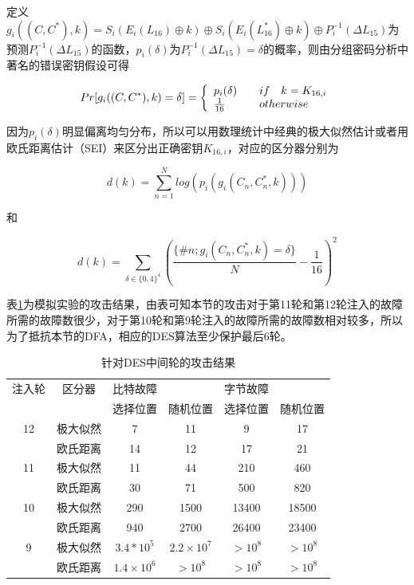 \documentclass[a4paper,12pt]{article}
\begin{document}
\begin{CJK}{UTF8}{gkai}
定义$g_i((C,C^*),k)=S_i(E_i(L_{16}) \oplus k) \oplus S_i(E_i(L_{16}^*) \oplus k) \oplus P_i^{-1}(\Delta L_{15})$为预测$P_i^{-1}(\Delta L_{15})$的函数，$p_i(\delta)$为$P_i^{-1}(\Delta L_{15}) = \delta$的概率，则由分组密码分析中著名的错误密钥假设可得

\[
  Pr[g_i((C, C^*), k) = \delta] = \left\{ 
  \begin{array}{l l}
    p_i(\delta) & \quad if \quad k = K_{16,i} \\
    \frac{1}{16} & \quad otherwise \\
  \end{array} \right.
\]

因为$p_i(\delta)$明显偏离均匀分布，所以可以用数理统计中经典的极大似然估计或者用欧氏距离估计（SEI）来区分出正确密钥$K_{16,i}$，对应的区分器分别为

\[
d(k)=\sum_{n=1}^{N}log(p_i(g_i(C_n,C_n^*, k)))
\]

和

\[
d(k) = \sum_{\delta \in \{0,4\}^4}( \frac{\{\#n;g_i(C_n,C_n^*,k) = \delta\}}{N} - \frac{1}{16})^2
\]

表\ref{tab:3_1}为模拟实验的攻击结果，由表可知本节的攻击对于第11轮和第12轮注入的故障所需的故障数很少，对于第10轮和第9轮注入的故障所需的故障数相对较多，所以为了抵抗本节的DFA，相应的DES算法至少保护最后6轮。

\begin{table}
\centering
\begin{tabular}{*{6}{c}}
注入轮 & 区分器 & 比特故障 &  & 字节故障  &   \\
\cline{3-3} \cline{5-5}
 & & 选择位置 & 随机位置 & 选择位置  & 随机位置  \\
\hline
12 & 极大似然 & 7 & 11 & 9 & 17 \\
   & 欧氏距离 & 14 & 12 & 17 & 21 \\
11 & 极大似然 & 11 & 44 & 210 & 460 \\
   & 欧氏距离 & 30 & 71 & 500 & 820 \\
10 & 极大似然 & 290 & 1500 & 13400 & 18500 \\
   & 欧氏距离 & 940 & 2700 & 26400 & 23400 \\
9  & 极大似然 & $3.4*10^5$ & $2.2 \times 10^7$ & $>10^8$ & $>10^8$ \\
   & 欧氏距离 & $1.4 \times 10^6$ & $>10^8$ & $>10^8$ & $>10^8$ \\
\end{tabular}
\caption{针对DES中间轮的攻击结果}
\label{tab:3_1}
\end{table}


\end{CJK}
\end{document}
